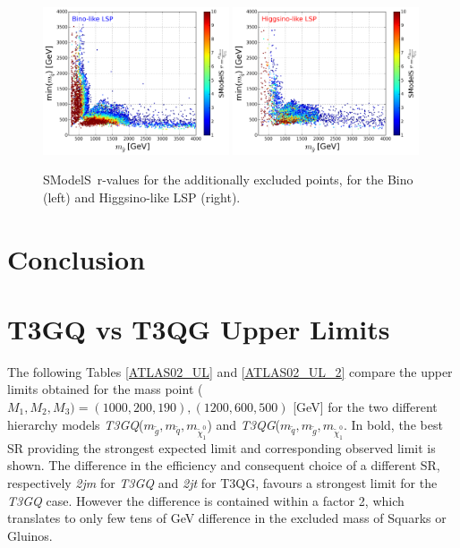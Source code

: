 \documentclass[a4paper,11pt]{article}
\newcommand{\SMO}{{\sc SModelS}}
\begin{document}
\begin{figure}[!]
\begin{center}
\subfigure
\includegraphics[width=0.49\textwidth]{PLOTS/BINO_rValus_Glu_Sq.png}
\subfigure
{\includegraphics[width=0.49\textwidth]{PLOTS/HIGGSINO_rValus_Glu_Sq.png}}
\end{center}
\caption{\SMO~r-values for the additionally excluded points, for the Bino (left) and Higgsino-like LSP (right).} 
\label{rValues}
\end{figure}
%
\section{Conclusion}
%
\acknowledgments
%
\clearpage
\appendix
\section{T3GQ vs T3QG Upper Limits}
The following Tables \ref{ATLAS02_UL} and \ref{ATLAS02_UL_2}  compare the upper limits obtained for the mass point ($M_1,M_2,M_3) = (1000,200,190),(1200,600,500)$ [GeV] for the two different hierarchy models \textit{T3GQ}($m_{\tilde g}, m_{\tilde q}, m_{\tilde \chi _1 ^0 }$) and \textit{T3QG}($m_{\tilde q}, m_{\tilde g}, m_{\tilde \chi _1 ^0 }$. In bold, the best SR providing the strongest expected limit and corresponding observed limit is shown. The difference in the efficiency and consequent choice of a different SR, respectively \textit{2jm} for \textit{T3GQ} and \textit{2jt} for T3QG, favours a strongest limit for the \textit{T3GQ} case. However the difference is contained within a factor 2, which translates to only few tens of GeV difference in the excluded mass of Squarks or Gluinos.
\end{document}
